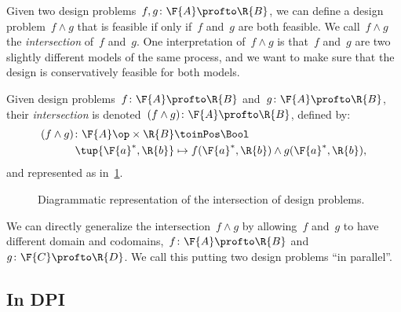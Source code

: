 Given two design problems~$f, g \colon \F{A} \profto \R{B}$, we can define a design problem~$f \wedge g$ that is feasible if only if~$f$ and~$g$ are both feasible. We call~$f \wedge g$ the \emph{intersection} of~$f$ and~$g$. One interpretation of~$f \wedge g$ is that~$f$ and~$g$ are two slightly different models of the same process, and we want to make sure that the design is conservatively feasible for both models.

\begin{definition}
  \label{def:dp-intersection}
  Given design problems~$f\colon \F{A} \profto \R{B}$ and~$g\colon \F{A} \profto \R{B}$,
  their \emph{intersection} is denoted~$(f \wedge g)\colon \F{A} \profto \R{B}$, defined by:
  \begin{equation}
    \begin{aligned}
    (f \wedge g)
      \colon \F{A}\op \times \R{B} & \toinPos \Bool \\
      \tup{\F{a}^*, \R{b}} & \mapsto f(\F{a}^*, \R{b}) \wedge  g(\F{a}^*, \R{b}),
    \end{aligned}
  \end{equation}
  and represented as in~\cref{fig:intersectiondp}.
\end{definition}

\begin{figure}[h!]
  \begin{center}
  \end{center}
  \caption{Diagrammatic representation of the intersection of design problems. \label{fig:intersectiondp}}
\end{figure}

We can directly generalize the intersection~$f \wedge g$ by allowing~$f$ and~$g$ to have different domain and codomains,~$f \colon \F{A} \profto \R{B}$ and~$g \colon \F{C} \profto \R{D}$. We call this putting two design problems ``in parallel''.

\subsection{In DPI}\label{subsec:dpi-intersection}

